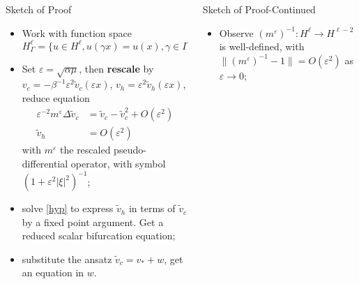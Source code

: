 \documentclass[final]{beamer}
\newlength{\onecolwid}
\newlength{\twocolwid}
\begin{document}
\begin{frame}[t]
\begin{columns}[t]
\begin{column}{\twocolwid}
\begin{columns}[t,totalwidth=\twocolwid]
\begin{column}{\onecolwid}
\begin{block}{ Sketch of Proof} 
\begin{itemize}
\item Work with function space
\[
H^\ell_{\Gamma} = \{u\in H^\ell, u(\gamma x)=u(x), \gamma\in \Gamma\};
\]
\item Set $\varepsilon = \sqrt{\alpha \mu}$, then \textbf{rescale} by $v_c =-\beta^{-1} \varepsilon^2 \tilde{v}_c(\varepsilon x)$, $v_h = \varepsilon^2 \tilde{v}_h(\varepsilon x)$, reduce equation
\begin{align}
\varepsilon^{-2}m^{\varepsilon} \Delta\tilde{v}_c &= \tilde{v}_c-\tilde{v}_c^2 + O(\varepsilon^2)\label{cent}\\ 
\tilde{v}_h &= O(\varepsilon^2) \label{hyp}
\end{align}
with $m^\varepsilon$ the rescaled pseudo-differential operator, with symbol $(1+\varepsilon^2 |\xi|^2)^{-1}$;
\item  solve \eqref{hyp} to express $\tilde{v}_h$ in terms of $\tilde{v}_c$ by a fixed point argument. Get a reduced scalar bifurcation equation;
\item substitute the ansatz $\tilde{v}_c = v_* + w$, get an equation in $w$.
\end{itemize}
\end{block}


\end{column} %

\begin{column}{\onecolwid} %


\begin{block}{ Sketch of Proof-Continued}
\begin{itemize}

\item Observe $(m^{\varepsilon})^{-1}: H^\ell \to H^{\ell-2}$ is well-defined, with $\|(m^{\varepsilon})^{-1}-1\| =O(\varepsilon^2) $ as $\varepsilon \to 0$;


\end{itemize}
\end{block}
\end{column}
\end{columns}
\end{column}
\end{columns}
\end{frame}
\end{document}
